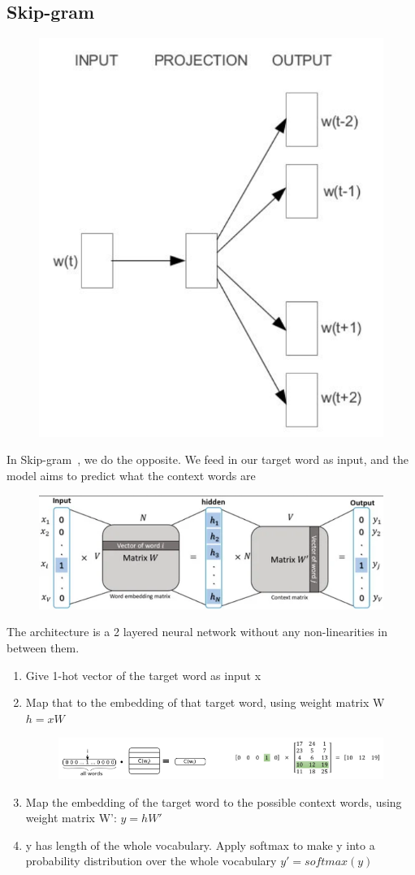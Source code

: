 \documentclass[11pt]{article}
\begin{document}
\subsection{Skip-gram}

\begin{figure}[H]
    \centering
    \includegraphics[width=.3\linewidth]{figures/SkipGram.png}
\end{figure}

In Skip-gram~\cite{WordSenseDisambiguation,CBOW-and-skipgram}, we do the opposite. We feed in our target word as input, and the model aims to predict what the context words are

\begin{figure}[H]
    \centering
    \includegraphics[trim={0 0 0 5px}, clip, width=\linewidth]{figures/SkipGramDetailed.png}
\end{figure}

The architecture is a 2 layered neural network without any non-linearities in between them. 

\begin{enumerate}
    \item Give 1-hot vector of the target word as input x
    \item Map that to the embedding of that target word, using weight matrix W $h=xW$
    
    \begin{figure}[H]
        \centering
        \includegraphics*[width=\linewidth]{figures/one-hot-word-embedding-extraction.png}
    \end{figure}

    \item Map the embedding of the target word to the possible context words, using weight matrix W': $y=hW'$
    \item y has length of the whole vocabulary. Apply softmax to make y into a probability distribution over the whole vocabulary $y'=softmax(y)$
\end{enumerate}
\end{document}
